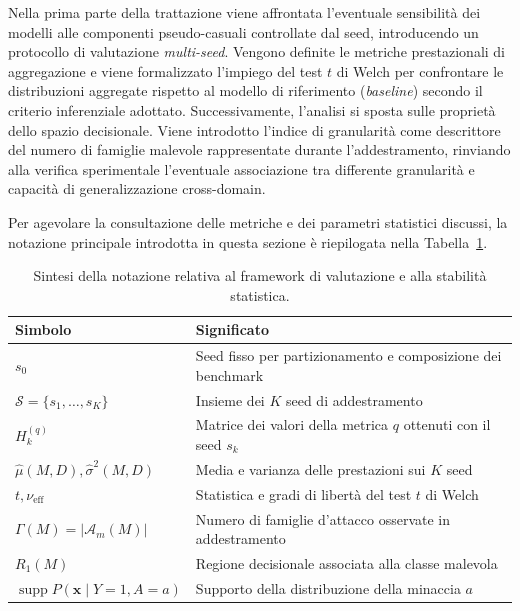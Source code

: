 Nella prima parte della trattazione viene affrontata l'eventuale sensibilità dei modelli alle componenti pseudo-casuali controllate dal seed, introducendo un protocollo di valutazione \textit{multi-seed}. 
Vengono definite le metriche prestazionali di aggregazione e viene formalizzato l'impiego del test $t$ di Welch per confrontare le distribuzioni aggregate rispetto al modello di riferimento (\textit{baseline}) secondo il criterio inferenziale adottato. 
Successivamente, l'analisi si sposta sulle proprietà dello spazio decisionale. 
Viene introdotto l'indice di granularità come descrittore del numero di famiglie malevole rappresentate durante l'addestramento, rinviando alla verifica sperimentale l'eventuale associazione tra differente granularità e capacità di generalizzazione cross-domain.

Per agevolare la consultazione delle metriche e dei parametri statistici discussi, la notazione principale introdotta in questa sezione è riepilogata nella Tabella~\ref{tab:notazione_valutazione}.

\begin{table}[H]
    \centering
    \small
    \caption{Sintesi della notazione relativa al framework di valutazione e alla stabilità statistica.}
    \label{tab:notazione_valutazione}
    \begin{tabularx}{\textwidth}{
        l
        >{\raggedright\arraybackslash}X
    }
        \toprule
        \textbf{Simbolo} & \textbf{Significato} \\
        \midrule

        $s_0$ &
        Seed fisso per partizionamento e composizione dei benchmark \\

        $\mathcal{S} = \{s_1, \dots, s_K\}$ &
        Insieme dei $K$ seed di addestramento \\

        $H_k^{(q)}$ &
        Matrice dei valori della metrica $q$ ottenuti con il seed $s_k$ \\

        $\hat{\mu}(M,D), \hat{\sigma}^2(M,D)$ &
        Media e varianza delle prestazioni sui $K$ seed \\

        $t, \nu_{\text{eff}}$ &
        Statistica e gradi di libertà del test $t$ di Welch \\

        $\Gamma(M) = |\mathcal{A}_m(M)|$ &
        Numero di famiglie d'attacco osservate in addestramento \\

        $R_1(M)$ &
        Regione decisionale associata alla classe malevola \\

        $\operatorname{supp} P(\mathbf{x} \mid Y=1, A=a)$ &
        Supporto della distribuzione della minaccia $a$ \\

        \bottomrule
    \end{tabularx}
\end{table}

